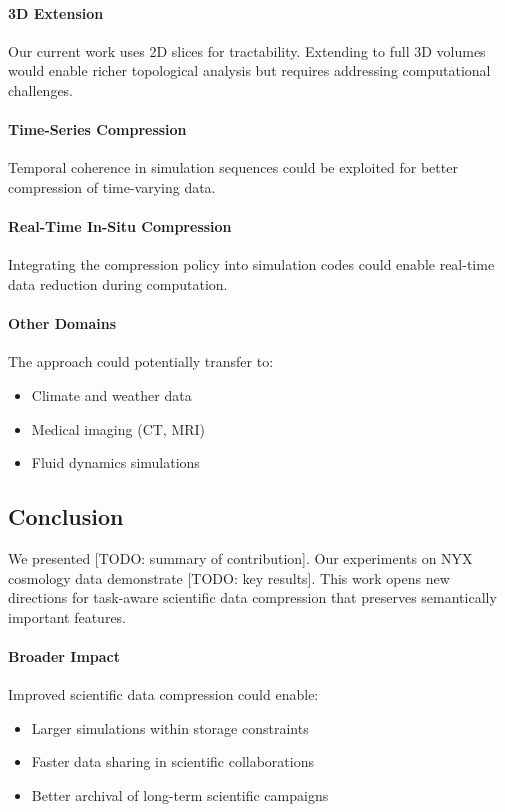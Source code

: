 \paragraph{3D Extension}
Our current work uses 2D slices for tractability. Extending to full 3D volumes would enable richer topological analysis but requires addressing computational challenges.

\paragraph{Time-Series Compression}
Temporal coherence in simulation sequences could be exploited for better compression of time-varying data.

\paragraph{Real-Time In-Situ Compression}
Integrating the compression policy into simulation codes could enable real-time data reduction during computation.

\paragraph{Other Domains}
The approach could potentially transfer to:
\begin{itemize}
    \item Climate and weather data
    \item Medical imaging (CT, MRI)
    \item Fluid dynamics simulations
\end{itemize}

\subsection{Conclusion}


We presented [TODO: summary of contribution]. Our experiments on NYX cosmology data demonstrate [TODO: key results]. This work opens new directions for task-aware scientific data compression that preserves semantically important features.

\paragraph{Broader Impact}
Improved scientific data compression could enable:
\begin{itemize}
    \item Larger simulations within storage constraints
    \item Faster data sharing in scientific collaborations
    \item Better archival of long-term scientific campaigns
\end{itemize}
